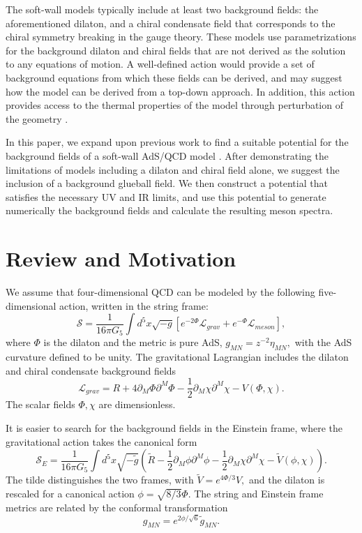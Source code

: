 \documentclass[12pt]{article}
\newcommand{\be}{\begin{equation}}
\newcommand{\ee}{\end{equation}}
\def\thalf{{\textstyle{\frac{1}{2}}}}
\newcommand{\cL}{\mathcal L}
\newcommand{\cS}{\mathcal S}
\begin{document}
The soft-wall models typically include at least two background fields: the aforementioned dilaton, and a chiral condensate field that corresponds to the chiral symmetry breaking in the gauge theory.
These models use parametrizations for the background dilaton and chiral fields that are not derived as the solution to any equations of motion. 
A well-defined action would provide a set of background equations from which these fields can be derived, and may suggest how the model can be derived from a top-down approach. 
In addition, this action provides access to the thermal properties of the model through perturbation of the geometry \cite{Herzog2007, Bayona2008, Gursoy2008b}.

In this paper, we expand upon previous work to find a suitable potential for the background fields of a soft-wall AdS/QCD model \cite{Batell2008, Springer2010, Gursoy2008a, Gursoy2008b, Csaki2007, Li2013, Li2013a, He2013}. 
After demonstrating the limitations of models including a dilaton and chiral field alone, we suggest the inclusion of a background glueball field. 
We then construct a potential that satisfies the necessary UV and IR limits, and use this potential to generate numerically the background fields and calculate the resulting meson spectra.


\section{Review and Motivation}\label{secReview}

We assume that four-dimensional QCD can be modeled by the following five-dimensional action, written in the string frame:
\be
\cS =\frac{1}{16\pi G_5} \int d^5x \sqrt{-g} \left[ e^{-2\Phi} \cL_{grav} + e^{-\Phi} \cL_{meson} \right], 
\label{eqStringAction}
\ee
where $\Phi$ is the dilaton and the metric is pure AdS, $g_{MN}=z^{-2}\eta_{MN},$ with the AdS curvature defined to be unity.
The gravitational Lagrangian includes the dilaton and chiral condensate background fields
\be
\cL_{grav}=R+4\partial_M\Phi\partial^M\Phi - \thalf\partial_M\chi\partial^M\chi -V(\Phi,\chi).
\ee
The scalar fields $\Phi,\chi$ are dimensionless. 

It is easier to search for the background fields in the Einstein frame, where the gravitational action takes the canonical form
\be
\cS_E=\frac{1}{16\pi G_5} \int d^5x \sqrt{-\tilde{g}}\left(\tilde{R}-\thalf\partial_M\phi\partial^M\phi -\thalf\partial_M\chi\partial^M\chi - \tilde{V}(\phi,\chi)\right).
\ee
The tilde distinguishes the two frames, with $\tilde{V}=e^{4\Phi/3}V,$ and the dilaton is rescaled for a canonical action $\phi=\sqrt{8/3}\Phi$.
The string and Einstein frame metrics are related by the conformal transformation
\be
g_{MN}=e^{2\phi/\sqrt{6}}\tilde{g}_{MN}.
\ee
\end{document}
